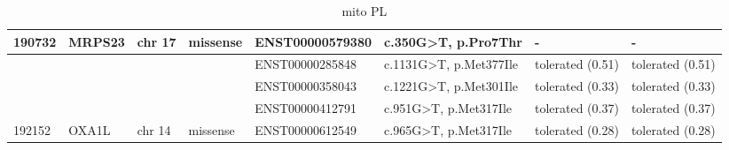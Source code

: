 \documentclass[fleqn,10pt]{wlscirep}
\begin{document}
\begin{landscape}
\begin{table}[]
{\begin{tabular}{|l|l|l|l|l|l|l|l|}
\multirow{-3}{*}{{\color[HTML]{000000} 190732}} & \multirow{-3}{*}{{\color[HTML]{000000} MRPS23}} & \multirow{-3}{*}{{\color[HTML]{000000} chr 17}} & \multirow{-3}{*}{{\color[HTML]{000000} missense}} & {\color[HTML]{000000} ENST00000579380}     & {\color[HTML]{000000} c.350G\textgreater{}T, p.Pro7Thr}    & {\color[HTML]{000000} -}                                 & -                                 \\ \hline
{\color[HTML]{000000} }                         & {\color[HTML]{000000} }                         & {\color[HTML]{000000} }                         & {\color[HTML]{000000} }                           & {\color[HTML]{000000} ENST00000285848}     & {\color[HTML]{000000} c.1131G\textgreater{}T, p.Met377Ile} & {\color[HTML]{000000} tolerated (0.51)}                  & tolerated (0.51)                  \\ \cline{5-8} 
{\color[HTML]{000000} }                         & {\color[HTML]{000000} }                         & {\color[HTML]{000000} }                         & {\color[HTML]{000000} }                           & {\color[HTML]{000000} ENST00000358043}     & {\color[HTML]{000000} c.1221G\textgreater{}T, p.Met301Ile} & {\color[HTML]{000000} tolerated (0.33)}                  & tolerated (0.33)                  \\ \cline{5-8} 
{\color[HTML]{000000} }                         & {\color[HTML]{000000} }                         & {\color[HTML]{000000} }                         & {\color[HTML]{000000} }                           & {\color[HTML]{000000} ENST00000412791}     & {\color[HTML]{000000} c.951G\textgreater{}T, p.Met317Ile}  & {\color[HTML]{000000} tolerated (0.37)}                  & tolerated (0.37)                  \\ \cline{5-8} 
\multirow{-4}{*}{{\color[HTML]{000000} 192152}} & \multirow{-4}{*}{{\color[HTML]{000000} OXA1L}}  & \multirow{-4}{*}{{\color[HTML]{000000} chr 14}} & \multirow{-4}{*}{{\color[HTML]{000000} missense}} & {\color[HTML]{000000} ENST00000612549}     & {\color[HTML]{000000} c.965G\textgreater{}T, p.Met317Ile}  & {\color[HTML]{000000} tolerated (0.28)}                  & tolerated (0.28)                  \\ \hline
\end{tabular}%
}
\caption{mito PL}
\label{tab:mito}
\end{table}
\end{landscape}
\end{document}
